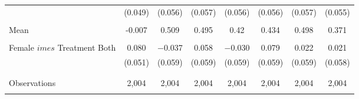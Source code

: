 \begin{tabular}{@{\extracolsep{5pt}}lccccccc}
  & (0.049) & (0.056) & (0.057) & (0.056) & (0.056) & (0.057) & (0.055) \\ 
  & & & & & & & \\ 
 Mean & -0.007 & 0.509 & 0.495 & 0.42 & 0.434 & 0.498 & 0.371  \\ \hline \\[-1.8ex] Female $	imes$ Treatment Both & 0.080 & $-$0.037 & 0.058 & $-$0.030 & 0.079 & 0.022 & 0.021 \\ 
  & (0.051) & (0.059) & (0.059) & (0.059) & (0.059) & (0.059) & (0.058) \\ 
  & & & & & & & \\ 
\hline \\[-1.8ex] 

Observations & 2,004 & 2,004 & 2,004 & 2,004 & 2,004 & 2,004 & 2,004 \\ 
\hline 
\hline \\[-1.8ex] 
\end{tabular} 